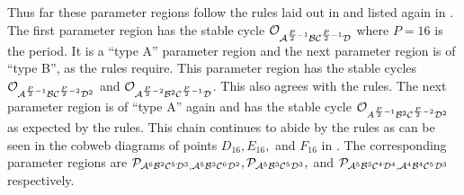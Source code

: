 Thus far these parameter regions follow the rules laid out in \cite{akyuz2022} and listed again in .
The first parameter region has the stable cycle $\mathcal{O}_{\mathcal{A}^{\frac{P}{2} - 1}\mathcal{B}\mathcal{C}^{\frac{P}{2} - 1}\mathcal{D}}$ where $P = 16$ is the period.
It is a ``type A'' parameter region and the next parameter region is of ``type B'', as the rules require.
This parameter region has the stable cycles $\mathcal{O}_{\mathcal{A}^{\frac{P}{2} - 1}\mathcal{B}\mathcal{C}^{\frac{P}{2} - 2}\mathcal{D}^2}$ and $\mathcal{O}_{\mathcal{A}^{\frac{P}{2} - 2}\mathcal{B}^2\mathcal{C}^{\frac{P}{2} - 1}\mathcal{D}}$.
This also agrees with the rules.
The next parameter region is of ``type A'' again and has the stable cycle $\mathcal{O}_{A^{\frac{P}{2} - 1}\mathcal{B}^2\mathcal{C}^{\frac{P}{2} - 2}\mathcal{D}^2}$ as expected by the rules.
This chain continues to abide by the rules as can be seen in the cobweb diagrams of points $D_{16}, E_{16},$ and $F_{16}$ in .
The corresponding parameter regions are $\mathcal{P}_{\mathcal{A}^6\mathcal{B}^2\mathcal{C}^5\mathcal{D}^3, \mathcal{A}^5\mathcal{B}^3\mathcal{C}^6\mathcal{D}^2}, \mathcal{P}_{\mathcal{A}^5\mathcal{B}^3\mathcal{C}^5\mathcal{D}^3},$ and $\mathcal{P}_{\mathcal{A}^5\mathcal{B}^3\mathcal{C}^4\mathcal{D}^4, \mathcal{A}^4\mathcal{B}^4\mathcal{C}^5\mathcal{D}^3}$ respectively.

